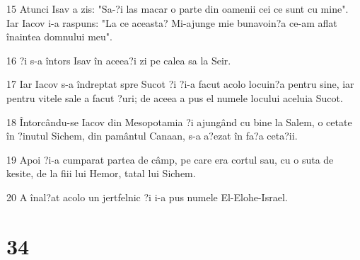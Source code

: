 \par 15 Atunci Isav a zis: "Sa-?i las macar o parte din oamenii cei ce sunt cu mine". Iar Iacov i-a raspuns: "La ce aceasta? Mi-ajunge mie bunavoin?a ce-am aflat înaintea domnului meu".
\par 16 ?i s-a întors Isav în aceea?i zi pe calea sa la Seir.
\par 17 Iar Iacov s-a îndreptat spre Sucot ?i ?i-a facut acolo locuin?a pentru sine, iar pentru vitele sale a facut ?uri; de aceea a pus el numele locului aceluia Sucot.
\par 18 Întorcându-se Iacov din Mesopotamia ?i ajungând cu bine la Salem, o cetate în ?inutul Sichem, din pamântul Canaan, s-a a?ezat în fa?a ceta?ii.
\par 19 Apoi ?i-a cumparat partea de câmp, pe care era cortul sau, cu o suta de kesite, de la fiii lui Hemor, tatal lui Sichem.
\par 20 A înal?at acolo un jertfelnic ?i i-a pus numele El-Elohe-Israel.

\chapter{34}

